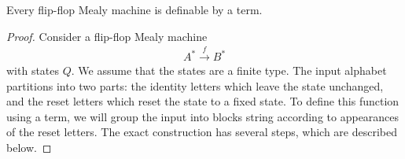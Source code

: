 \begin{lemma}\label{lem:terms-define-flip-flop}
        Every flip-flop Mealy machine is definable by a term.
\end{lemma}
\begin{proof}    
    Consider a flip-flop Mealy machine 
    \begin{align*}
    A^* \xrightarrow f B^*
    \end{align*}
    with states $Q$. We assume that the states are a finite type. 
    The input alphabet partitions into two parts: the identity letters which leave the state unchanged, and the reset letters which reset the state to a fixed state. To define this function using a term, we will group  the input into blocks string according to appearances of the reset letters. The exact construction has several steps, which are described below.


\end{proof}
